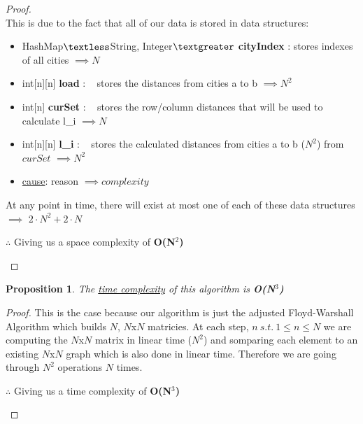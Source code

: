 \documentclass[12pt]{article}
\newtheorem{proposition}[theorem]{Proposition}
\begin{document}
\begin{proof}
~ \\ \indent This is due to the fact that all of our data is stored in data structures:
\begin{itemize}
     \item HashMap$\textless$String, Integer$\textgreater$ \textbf{cityIndex} : stores indexes of all cities $\implies N$
    \item int[n][n] \textbf{load} : ~ stores the distances from cities a to b $\implies N^2$
    \item int[n] \textbf{curSet} : ~ stores the row/column distances that will be used to calculate l\_i $\implies N$
    \item int[n][n] \textbf{l\_i} : ~ stores the calculated distances from cities a to b ($N^2$) from  $curSet$ $\implies N^2$
    \item \underline{cause}: reason $\implies complexity$
\end{itemize}
At any point in time, there will exist at most one of each of these data structures $\implies$ $2\cdot N^2 + 2\cdot N$
\begin{center}
    $\therefore$ Giving us a space complexity of \textbf{O(N$^2$)}
\end{center}
\end{proof}

\begin{proposition}
\label{numq}
The \underline{time complexity} of this algorithm is \textbf{O(N$^3$)}
\end{proposition}

\begin{proof}
This is the case because our algorithm is just the adjusted Floyd-Warshall
Algorithm which builds $N$, $N$x$N$ matricies. At each step, $n\ s.t.\ 1 \leq n \leq N$ we are
computing the $N$x$N$ matrix in linear time ($N^2$) and somparing each element to an
existing $N$x$N$ graph which is also done in linear time. Therefore we are going through
$N^2$ operations $N$ times.
\begin{center}
    $\therefore$ Giving us a time complexity of \textbf{O(N$^3$)}
\end{center}
\end{proof}

\end{document}
